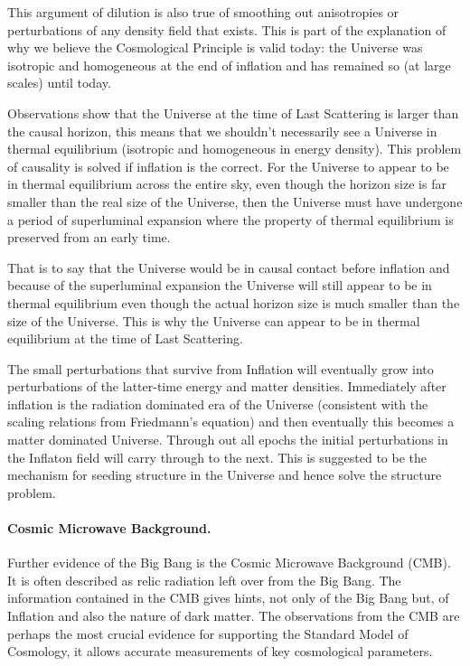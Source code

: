 This argument of dilution is also true of smoothing out anisotropies or perturbations of any density field that exists. This is part of the explanation of why we believe the Cosmological Principle is valid today: the Universe was isotropic and homogeneous at the end of inflation and has remained so (at large scales) until today.

Observations show that the Universe at the time of Last Scattering is larger than the causal horizon, this means that we shouldn't necessarily see a Universe in thermal equilibrium (isotropic and homogeneous in energy density). This problem of causality is solved if inflation is the correct. For the Universe to appear to be in thermal equilibrium across the entire sky, even though the horizon size is far smaller than the real size of the Universe, then the Universe must have undergone a period of superluminal expansion where the property of thermal equilibrium is preserved from an early time.

That is to say that the Universe would be in causal contact before inflation and because of the superluminal expansion the Universe will still appear to be in thermal equilibrium even though the actual horizon size is much smaller than the size of the Universe. This is why the Universe can appear to be in thermal equilibrium at the time of Last Scattering.

The small perturbations that survive from Inflation will eventually grow into perturbations of the latter-time energy and matter densities. Immediately after inflation is the radiation dominated era of the Universe (consistent with the scaling relations from Friedmann's equation) and then eventually this becomes a matter dominated Universe. Through out all epochs the initial perturbations in the Inflaton field will carry through to the next. This is suggested to be the mechanism for seeding structure in the Universe and hence solve the structure problem. \citep{bib_baum}

\paragraph{Cosmic Microwave Background.}
Further evidence of the Big Bang is the Cosmic Microwave Background (CMB). It is often described as relic radiation left over from the Big Bang. The information contained in the CMB gives hints, not only of the Big Bang but, of Inflation and also the nature of dark matter. The observations from the CMB are perhaps the most crucial evidence for supporting the Standard Model of Cosmology, it allows accurate measurements of key cosmological parameters.

